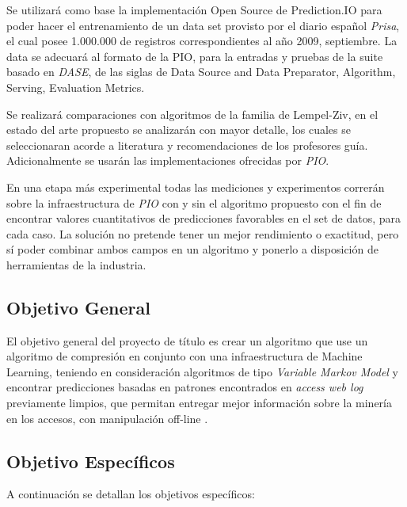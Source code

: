 \documentclass{udparticle}
\begin{document}
Se utilizará como base la implementación Open Source de Prediction.IO para poder hacer el entrenamiento de un data set provisto por el diario español \emph{Prisa}, el cual posee 1.000.000 de registros correspondientes al año 2009, septiembre. La data se adecuará al formato de la PIO, para la entradas y pruebas de la suite basado en \emph{DASE}, de las siglas de Data Source and Data Preparator, Algorithm, Serving, Evaluation Metrics.

Se realizará comparaciones con algoritmos de la familia de Lempel-Ziv, en el estado del arte propuesto se analizarán con mayor detalle, los cuales se seleccionaran acorde a literatura y recomendaciones de los profesores guía. Adicionalmente se usarán las implementaciones ofrecidas por \emph{PIO}.

En una etapa más experimental todas las mediciones y experimentos correrán sobre la infraestructura de \emph{PIO} con y sin el algoritmo propuesto con el fin de encontrar valores cuantitativos de predicciones favorables en el set de datos, para cada caso. La solución no pretende tener un mejor rendimiento o exactitud, pero sí poder combinar ambos campos en un algoritmo y ponerlo a disposición de herramientas de la industria.


\subsection{Objetivo General}
 
	El objetivo general del proyecto de título es crear un algoritmo que use un algoritmo de compresión en conjunto con una infraestructura de Machine Learning, teniendo en consideración algoritmos de tipo \emph{Variable Markov Model} y encontrar predicciones basadas en patrones encontrados en \emph{access web log} previamente limpios, que permitan entregar mejor información sobre la minería en los accesos, con manipulación off-line .
 
\subsection{Objetivo  Específicos }
 
A continuación se detallan los objetivos específicos:
 
\end{document}
